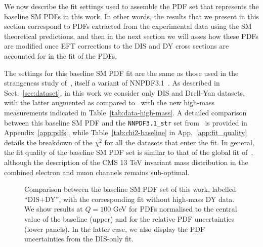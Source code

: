 \documentclass[withindex,glossary]{cam-thesis}
\begin{document}
We now describe the fit settings used to assemble the PDF set that
represents the baseline SM PDFs in this work.
%
In other words,
the results that we present in this section correspond to PDFs extracted from the experimental
data using the SM theoretical predictions, and then in the next section we will asses how these
PDFs are modified once EFT corrections to the DIS and DY cross
sections are accounted for in the fit of the PDFs.

The settings for this baseline SM PDF fit are the same as those used in the strangeness study
of~\cite{Faura:2020oom}, itself a variant of NNPDF3.1~\cite{Ball:2017nwa}.
%
As described in Sect.~\ref{sec:dataset}, in this work we consider only DIS
and Drell-Yan datasets, with the latter augmented as compared to~\cite{Faura:2020oom} with the new high-mass
measurements indicated in Table~\ref{tab:data-high-mass}.
%
A detailed comparison between this baseline SM PDF 
and the {\tt NNPDF3.1\_str} set from~\cite{Faura:2020oom} 
is provided in Appendix~\ref{app:pdfs},
while Table~\ref{tab:chi2-baseline} in App.~\ref{app:fit_quality} details the breakdown of the $\chi^2$
for all the datasets that enter the fit.
%
In general, the fit quality of the baseline SM PDF set
is similar to that of the global fit of~\cite{Faura:2020oom},
although the description of the CMS 13 TeV 
invariant mass distribution in the combined electron and muon 
channels remains sub-optimal.

\begin{figure}[t]
  \centering
  \caption{\small \small Comparison between the baseline SM PDF set of this work, labelled ``DIS+DY'', with
    the corresponding fit without high-mass DY data.
  We show results at $Q=100$ GeV for PDFs normalised to the central value of the baseline (upper) and
  for the relative PDF uncertainties (lower panels).
  In the latter case, we also display the PDF uncertainties from the DIS-only fit.
  \label{fig:pdfplot-impactHMDY}}
\end{figure}
\end{document}
